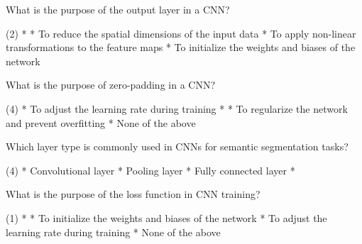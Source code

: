 \documentclass[10pt]{extarticle}
\begin{document}
\begin{exercise}
    What is the purpose of the output layer in a CNN?
    \begin{choice} (2)
        * 
        * To reduce the spatial dimensions of the input data
        * To apply non-linear transformations to the feature maps
        * To initialize the weights and biases of the network
    \end{choice}
\end{exercise}
\begin{solution}
\end{solution}

\begin{exercise}
    What is the purpose of zero-padding in a CNN?
    \begin{choice} (4)
        * To adjust the learning rate during training
        * 
        * To regularize the network and prevent overfitting
        * None of the above
    \end{choice}
\end{exercise}
\begin{solution}
\end{solution}

\begin{exercise}
    Which layer type is commonly used in CNNs for semantic segmentation tasks?
    \begin{choice} (4)
        * Convolutional layer
        * Pooling layer
        * Fully connected layer
        * 
    \end{choice}
\end{exercise}
\begin{solution}
\end{solution}

\begin{exercise}
    What is the purpose of the loss function in CNN training?
    \begin{choice} (1)
        * 
        * To initialize the weights and biases of the network
        * To adjust the learning rate during training
        * None of the above
    \end{choice}
\end{exercise}
\begin{solution}
\end{solution}
\end{document}
